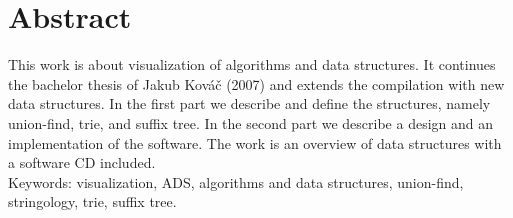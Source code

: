 \newpage

\chapter*{Abstract}
This work is about visualization of algorithms and data structures. It continues 
the bachelor thesis of Jakub Kováč (2007) and extends the compilation with 
new data structures. In the first part we describe and define the structures, 
namely union-find, trie, and suffix tree. In the second part we describe a design 
and an implementation of the software. The work is an overview of data structures 
with a software CD included.\\
Keywords: visualization, ADS, algorithms and data structures, union-find, 
stringology, trie, suffix tree.
\newpage

\mbox{}
\newpage

\tableofcontents\newpage
